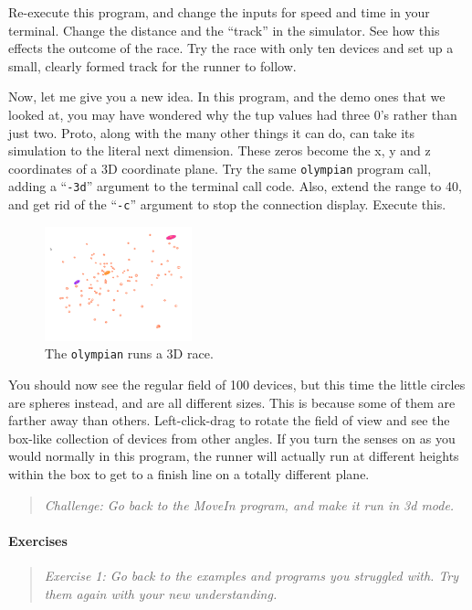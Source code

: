 \documentclass{article}
\newcommand\problem[1]{\begin{quote}{\em #1}\end{quote}}
\newcommand\var[1]{{\tt #1}}
\newcommand\qvar[1]{``{\tt #1}''}
\begin{document}
Re-execute this program, and change the inputs for speed and time in
your terminal.  Change the distance and the ``track'' in the
simulator.  See how this effects the outcome of the race.  Try the
race with only ten devices and set up a small, clearly formed track
for the runner to follow.

Now, let me give you a new idea. In this program, and the demo ones
that we looked at, you may have wondered why the tup values had three
0's rather than just two.  Proto, along with the many other things it
can do, can take its simulation to the literal next dimension.  These
zeros become the x, y and z coordinates of a 3D coordinate plane.  Try
the same \var{olympian} program call, adding a \qvar{-3d} argument to
the terminal call code.  Also, extend the range to 40, and get rid of
the \qvar{-c} argument to stop the connection display.  Execute this.

\begin{figure}
  \includegraphics[width=0.38\textwidth]{figures/olympian-3d.png}
  \caption{The \var{olympian} runs a 3D race.}
  \label{f:olympianthreed}
\end{figure}

You should now see the regular field of 100 devices, but this time the
little circles are spheres instead, and are all different sizes.  This
is because some of them are farther away than others.  Left-click-drag
to rotate the field of view and see the box-like collection of devices
from other angles.  If you turn the senses on as you would normally in
this program, the runner will actually run at different heights within
the box to get to a finish line on a totally different
plane. 

\problem{Challenge: Go back to the MoveIn program, and make it run in
  3d mode.}

\paragraph{Exercises}
\problem{Exercise 1: Go back to the examples and programs you
  struggled with. Try them again with your new understanding.}
\end{document}
